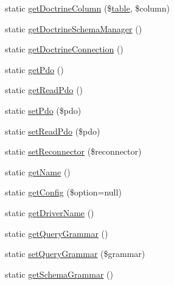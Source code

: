 \begin{DoxyCompactItemize}
static \mbox{\hyperlink{class_illuminate_1_1_support_1_1_facades_1_1_d_b_adcf6459b45d2f8d7e4dec936776f4a61}{get\+Doctrine\+Column}} (\$\mbox{\hyperlink{class_illuminate_1_1_support_1_1_facades_1_1_d_b_aab727b2bb999e68aafe6ddb5ffb6474a}{table}}, \$column)
\item 
static \mbox{\hyperlink{class_illuminate_1_1_support_1_1_facades_1_1_d_b_ae21d1ea519b88badb605f89d762481f7}{get\+Doctrine\+Schema\+Manager}} ()
\item 
static \mbox{\hyperlink{class_illuminate_1_1_support_1_1_facades_1_1_d_b_a8ffa84e16329112f2d4e846889924f6c}{get\+Doctrine\+Connection}} ()
\item 
static \mbox{\hyperlink{class_illuminate_1_1_support_1_1_facades_1_1_d_b_ad3501e92add7380a83baa4cfdfa7c9ad}{get\+Pdo}} ()
\item 
static \mbox{\hyperlink{class_illuminate_1_1_support_1_1_facades_1_1_d_b_ad1896a49c96025d4adf59acd222e2919}{get\+Read\+Pdo}} ()
\item 
static \mbox{\hyperlink{class_illuminate_1_1_support_1_1_facades_1_1_d_b_a8605551272521c40410a5d88c8cd859c}{set\+Pdo}} (\$pdo)
\item 
static \mbox{\hyperlink{class_illuminate_1_1_support_1_1_facades_1_1_d_b_a2cb0be42acf9aa04a85a4064c4555e95}{set\+Read\+Pdo}} (\$pdo)
\item 
static \mbox{\hyperlink{class_illuminate_1_1_support_1_1_facades_1_1_d_b_ab2c074b6ece85279ce8edbc4279d5c1a}{set\+Reconnector}} (\$reconnector)
\item 
static \mbox{\hyperlink{class_illuminate_1_1_support_1_1_facades_1_1_d_b_a61397bc6e365367fefcf35adf2fb9641}{get\+Name}} ()
\item 
static \mbox{\hyperlink{class_illuminate_1_1_support_1_1_facades_1_1_d_b_a03c2bdae93ae18ffdffe6bc8bd076a12}{get\+Config}} (\$option=null)
\item 
static \mbox{\hyperlink{class_illuminate_1_1_support_1_1_facades_1_1_d_b_a8d8d4afe3eca7fd32e8c4bfb5468fda4}{get\+Driver\+Name}} ()
\item 
static \mbox{\hyperlink{class_illuminate_1_1_support_1_1_facades_1_1_d_b_a82f339b255b77fa638142ccc9b47f155}{get\+Query\+Grammar}} ()
\item 
static \mbox{\hyperlink{class_illuminate_1_1_support_1_1_facades_1_1_d_b_a0ad919b9b783e4aca37c6a10f9c04f6d}{set\+Query\+Grammar}} (\$grammar)
\item 
static \mbox{\hyperlink{class_illuminate_1_1_support_1_1_facades_1_1_d_b_abe52dc2468eb4c844be85421c1363671}{get\+Schema\+Grammar}} ()

\end{DoxyCompactItemize}
